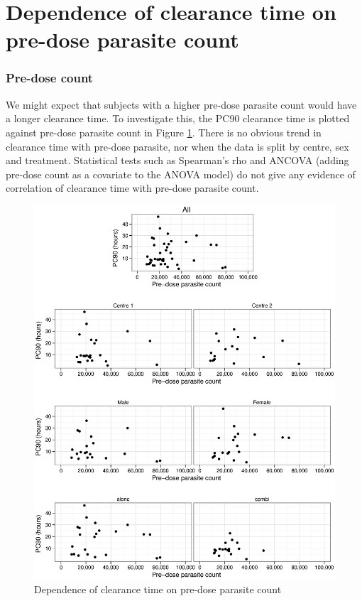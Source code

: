 \section{Dependence of clearance time on pre-dose parasite count}
\subsubsection*{Pre-dose count}\label{sec:predoseancova}
We might expect that subjects with a higher pre-dose parasite count would have a longer clearance time. To investigate this, the PC90 clearance time is plotted against pre-dose parasite count in Figure \ref{predose-ancova}. There is no obvious trend in clearance time with pre-dose parasite, nor when the data is split by centre, sex and treatment. Statistical tests such as Spearman's rho and ANCOVA (adding pre-dose count as a covariate to the ANOVA model) do not give any evidence of correlation of clearance time with pre-dose parasite count.
\begin{figure}[p]
\includegraphics[width=150mm]{predose-ancova.eps} 
\caption{Dependence of clearance time on pre-dose parasite count}
\label{predose-ancova}
\end{figure}


